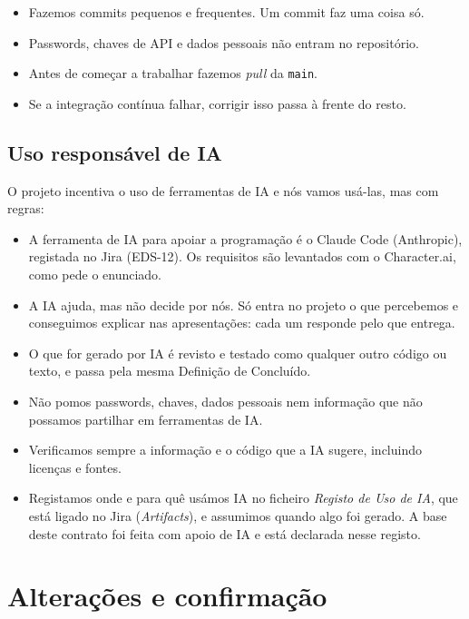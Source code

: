 \documentclass[11pt,a4paper]{article}
\begin{document}
\begin{itemize}
  \item Fazemos commits pequenos e frequentes. Um commit faz uma coisa só.
  \item Passwords, chaves de API e dados pessoais não entram no repositório.
  \item Antes de começar a trabalhar fazemos \textit{pull} da \texttt{main}.
  \item Se a integração contínua falhar, corrigir isso passa à frente do resto.
\end{itemize}

\subsection{Uso responsável de IA}

O projeto incentiva o uso de ferramentas de IA e nós vamos usá-las, mas com regras:

\begin{itemize}
  \item A ferramenta de IA para apoiar a programação é o Claude Code (Anthropic), registada no Jira (EDS-12). Os requisitos são levantados com o Character.ai, como pede o enunciado.
  \item A IA ajuda, mas não decide por nós. Só entra no projeto o que percebemos e conseguimos explicar nas apresentações: cada um responde pelo que entrega.
  \item O que for gerado por IA é revisto e testado como qualquer outro código ou texto, e passa pela mesma Definição de Concluído.
  \item Não pomos passwords, chaves, dados pessoais nem informação que não possamos partilhar em ferramentas de IA.
  \item Verificamos sempre a informação e o código que a IA sugere, incluindo licenças e fontes.
  \item Registamos onde e para quê usámos IA no ficheiro \textit{Registo de Uso de IA}, que está ligado no Jira (\textit{Artifacts}), e assumimos quando algo foi gerado. A base deste contrato foi feita com apoio de IA e está declarada nesse registo.
\end{itemize}

\section{Alterações e confirmação}
\end{document}

